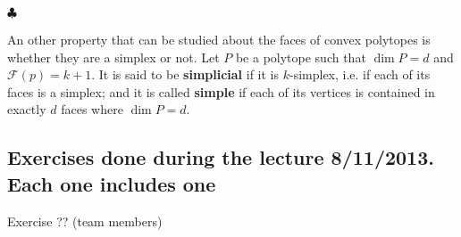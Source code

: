 \begin{flushright}
$\clubsuit$
\end{flushright}

\bigskip

An other property that can be studied about the faces of convex polytopes is whether they are a simplex or not. Let $P$ be a polytope such that $\dim P = d$ and $\mathcal{F}(p) = k+1$. It is said to be \textbf{simplicial} if it is $k$-simplex, i.e. if each of its faces is a simplex; and it is called \textbf{simple} if each of its vertices is contained in exactly $d$ faces where $\dim P =d$.

\bigskip
\subsection{Exercises done during the lecture 8/11/2013. Each one includes one}

\begin{description}
\item[Exercise ?? (team members)] 
\end{description}



